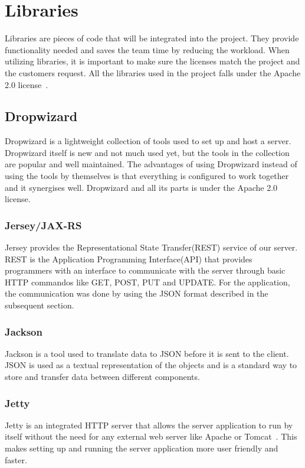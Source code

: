 \section{Libraries}
\label{sec:libraries}
Libraries are pieces of code that will be integrated into the project. They provide functionality needed and saves the team time by reducing the workload. 
When utilizing libraries, it is important to make sure the licenses match the project and the customers request. All the libraries used in the project falls under the Apache 2.0 license~\cite{Apache}.

\subsection{Dropwizard}
Dropwizard is a lightweight collection of tools used to set up and host a server. Dropwizard itself is new and not much used yet, but the tools in the collection are popular and well maintained. 
The advantages of using Dropwizard instead of using the tools by themselves is that everything is configured to work together and it synergises well.
Dropwizard and all its parts is under the Apache 2.0 license. 

\subsubsection{Jersey/JAX-RS}
Jersey provides the Representational State Transfer(REST) service of our server. REST is the Application Programming Interface(API) that provides programmers with an 
interface to communicate with the server through basic HTTP commandos like GET, POST, PUT and UPDATE. For the application, the communication was done by using the JSON format 
described in the subsequent section.

\subsubsection{Jackson}
Jackson is a tool used to translate data to JSON before it is sent to the client. JSON is used as a textual representation of the objects and is a standard way to store 
and transfer data between different components.

\subsubsection{Jetty}
Jetty is an integrated HTTP server that allows the server application to run by itself without the need for any external web server like Apache or Tomcat~\cite{tomcat}. 
This makes setting up and running the server application more user friendly and faster.


